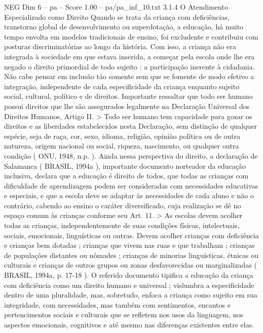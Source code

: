 \begin{textsample}{NEG Dim 6 – pa – Score 1.00 – pa/pa\_inf\_10.txt}  \label{ex:f6_neg_223}
3.1.4 O Atendimento Especializado como Direito Quando se trata da criança com deficiências, transtorno global de desenvolvimento ou superdotação, a educação, há muito tempo envolta em modelos tradicionais de ensino, foi excludente e contribuiu com posturas discriminatórias ao longo da história.
Com isso, a criança não era integrada à sociedade em que estava inserida, a começar pela escola onde lhe era negado o direito primordial de todo sujeito : a participação inerente à cidadania.
Não cabe pensar em inclusão tão somente sem que se fomente de modo efetivo a integração, independente de cada especificidade da criança enquanto sujeito social, cultural, político e de direitos.
Importante ressaltar que todo ser humano possui direitos que lhe são assegurados legalmente na Declaração Universal dos Direitos Humanos, Artigo II. > Todo ser humano tem capacidade para gozar os direitos e as liberdades estabelecidos nesta Declaração, sem distinção de qualquer espécie, seja de raça, cor, sexo, idioma, religião, opinião política ou de outra natureza, origem nacional ou social, riqueza, nascimento, ou qualquer outra condição ( ONU, 1948, n.p. ).
Ainda nessa perspectiva do direito, a declaração de Salamanca ( BRASIL, 1994a ), importante documento norteador da educação inclusiva, declara que a educação é direito de todos, que todas as crianças com dificuldade de aprendizagem podem ser consideradas com necessidades educativas e especiais, e que a escola deve se adaptar às necessidades de cada aluno e não o contrário, cabendo ao ensino o caráter diversificado, cuja realização se dê no espaço comum às crianças conforme seu Art. 11. > As escolas devem acolher todas as crianças, independentemente de suas condições físicas, intelectuais, sociais, emocionais, linguísticas ou outras.
Devem acolher crianças com deficiência e crianças bem dotadas ; crianças que vivem nas ruas e que trabalham ; crianças de populações distantes ou nômades ; crianças de minorias linguísticas, étnicas ou culturais e crianças de outros grupos ou zonas desfavorecidas ou marginalizadas ( BRASIL, 1994a, p. 17-18 ).
O referido documento tipifica a educação da criança com deficiência como um direito humano e universal ; vislumbra a especificidade dentro de uma pluralidade, mas, sobretudo, enfoca a criança como sujeito em sua integridade, com necessidades, mas também com sentimentos, encantos e pertencimentos sociais e culturais que se refletem nos usos da linguagem, nos aspectos emocionais, cognitivos e até mesmo nas diferenças existentes entre elas.

\end{textsample}
